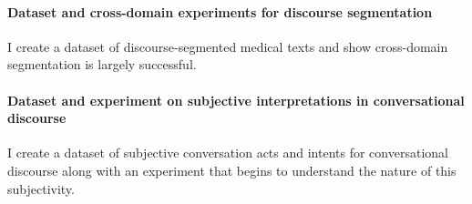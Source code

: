 \paragraph{Dataset and cross-domain experiments for discourse segmentation}
I create a dataset of discourse-segmented medical texts and show cross-domain segmentation is largely successful.

\paragraph{Dataset and experiment on subjective interpretations in conversational discourse}
I create a dataset of subjective conversation acts and intents for conversational discourse along with an experiment that begins to understand the nature of this subjectivity.